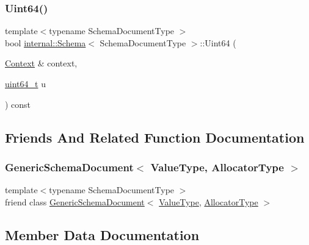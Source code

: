\subsubsection{\texorpdfstring{Uint64()}{Uint64()}}
{\footnotesize\ttfamily template$<$typename Schema\+Document\+Type $>$ \\
bool \hyperlink{classinternal_1_1Schema}{internal\+::\+Schema}$<$ Schema\+Document\+Type $>$\+::Uint64 (\begin{DoxyParamCaption}\item[{\hyperlink{classinternal_1_1Schema_ac3f54abfefe300c5610c1205869cfd66}{Context} \&}]{context,  }\item[{\hyperlink{stdint_8h_aec6fcb673ff035718c238c8c9d544c47}{uint64\+\_\+t}}]{u }\end{DoxyParamCaption}) const\hspace{0.3cm}{\ttfamily [inline]}}



\subsection{Friends And Related Function Documentation}
\mbox{\label{classinternal_1_1Schema_a04f1d1acd0a5a7fda069c115970d52b3}} 
\subsubsection{\texorpdfstring{Generic\+Schema\+Document$<$ Value\+Type, Allocator\+Type $>$}{GenericSchemaDocument< ValueType, AllocatorType >}}
{\footnotesize\ttfamily template$<$typename Schema\+Document\+Type $>$ \\
friend class \hyperlink{classGenericSchemaDocument}{Generic\+Schema\+Document}$<$ \hyperlink{classinternal_1_1Schema_a8976b6d7e2a885483d0b51d941019340}{Value\+Type}, \hyperlink{classinternal_1_1Schema_a7af392edd81e610754cd2e6b4f82761c}{Allocator\+Type} $>$\hspace{0.3cm}{\ttfamily [friend]}}



\subsection{Member Data Documentation}
\mbox{\label{classinternal_1_1Schema_a54a7c267fb131596bfab2efca431d247}} 
